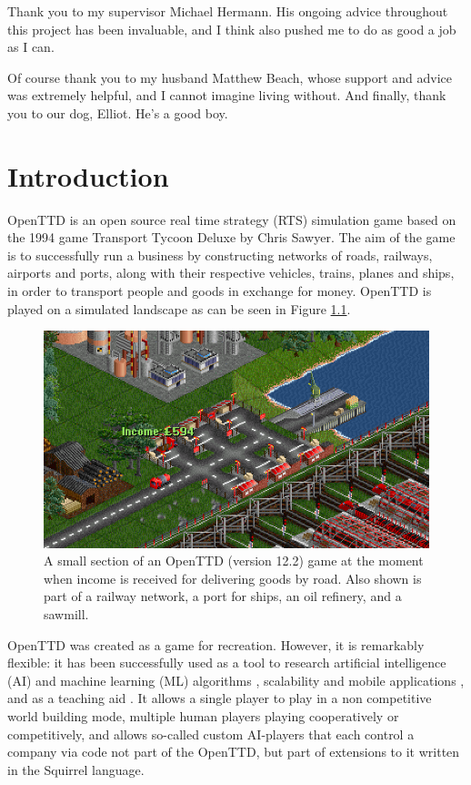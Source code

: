 \documentclass[logo,msc]{infthesis}           %
\begin{document}
\begin{preliminary}
\begin{acknowledgements}
Thank you to my supervisor Michael Hermann. His ongoing advice throughout this project has been invaluable, and I think also pushed me to do as good a job as I can.

Of course thank you to my husband Matthew Beach, whose support and advice was extremely helpful, and I cannot imagine living without. And finally, thank you to our dog, Elliot. He's a good boy.

\end{acknowledgements}


\tableofcontents
\end{preliminary}


\chapter{Introduction}

OpenTTD \cite{openttd} is an open source real time strategy (RTS) simulation game based on the 1994 game Transport Tycoon Deluxe by Chris Sawyer. The aim of the game is to successfully run a business by constructing networks of roads, railways, airports and ports, along with their respective vehicles, trains, planes and ships, in order to transport people and goods in exchange for money. OpenTTD is played on a simulated landscape as can be seen in Figure \ref{fig:openttd}.

\begin{figure}[h]
\centering
\includegraphics[width=\columnwidth]{assets/openttd-screenshot.png}
\caption{A small section of an OpenTTD (version 12.2) game at the moment when income is received for delivering goods by road. Also shown is part of a railway network, a port for ships, an oil refinery, and a sawmill.}
\label{fig:openttd}
\end{figure}


OpenTTD was created as a game for recreation. However, it is remarkably flexible: it has been successfully used as a tool to research artificial intelligence (AI) and machine learning (ML) algorithms \cite{wisniewski2011artificial, rios2009trains, bijlsma2014evolving}, scalability and mobile applications \cite{jiang2018mirroring}, and as a teaching aid \cite{HansenMuprhie2018}. It allows a single player to play in a non competitive world building mode, multiple human players playing cooperatively or competitively, and allows so-called custom AI-players that each control a company via code not part of the OpenTTD, but part of extensions to it written in the Squirrel language.
\end{document}

